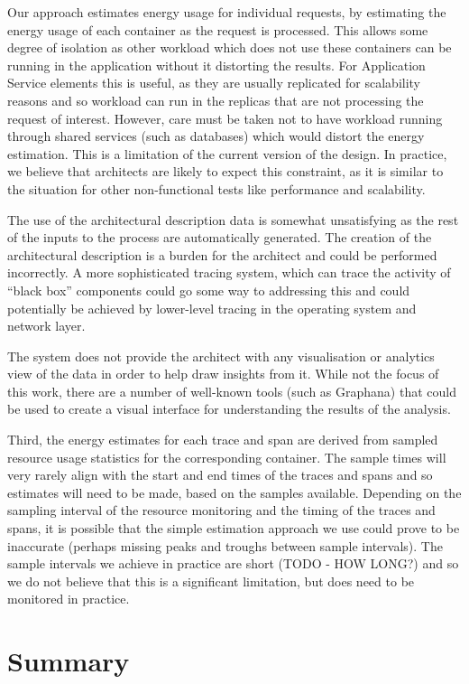 Our approach estimates energy usage for individual requests, by estimating the energy usage of each container as the request is processed.  This allows some degree of isolation as other workload which does not use these containers can be running in the application without it distorting the results.  For Application Service elements this is useful, as they are usually replicated for scalability reasons and so workload can run in the replicas that are not processing the request of interest.  However, care must be taken not to have workload running through shared services (such as databases) which would distort the energy estimation.  This is a limitation of the current version of the design. In practice, we believe that architects are likely to expect this constraint, as it is similar to the situation for other non-functional tests like performance and scalability.

The use of the architectural description data is somewhat unsatisfying as the rest of the inputs to the process are automatically generated.  The creation of the architectural description is a burden for the architect and could be performed incorrectly.  A more sophisticated tracing system, which can trace the activity of “black box” components could go some way to addressing this and could potentially be achieved by lower-level tracing in the operating system and network layer.

The system does not provide the architect with any visualisation or analytics view of the data in order to help draw insights from it.  While not the focus of this work, there are a number of well-known tools (such as Graphana) that could be used to create a visual interface for understanding the results of the analysis.

Third, the energy estimates for each trace and span are derived from sampled resource usage statistics for the corresponding container.  The sample times will very rarely align with the start and end times of the traces and spans and so estimates will need to be made, based on the samples available.  Depending on the sampling interval of the resource monitoring and the timing of the traces and spans, it is possible that the simple estimation approach we use could prove to be inaccurate (perhaps missing peaks and troughs between sample intervals).  The sample intervals we achieve in practice are short (TODO - HOW LONG?) and so we do not believe that this is a significant limitation, but does need to be monitored in practice.

\section{Summary}

